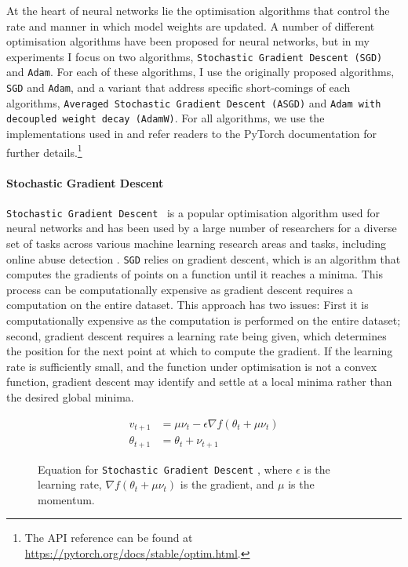 At the heart of neural networks lie the optimisation algorithms that control the rate and manner in which model weights are updated. 
A number of different optimisation algorithms have been proposed for neural networks, but in my experiments I focus on two algorithms, \texttt{Stochastic Gradient Descent (SGD)} and \texttt{Adam}. 
For each of these algorithms, I use the originally proposed algorithms, \texttt{SGD} and \texttt{Adam}, and a variant that address specific short-comings of each algorithms, \texttt{Averaged Stochastic Gradient Descent (ASGD)} and \texttt{Adam with decoupled weight decay (AdamW)}. 
For all algorithms, we use the implementations used in \citet{Paszke:2019} and refer readers to the PyTorch documentation for further details.\footnote{The API reference can be found at \url{https://pytorch.org/docs/stable/optim.html}.}

\paragraph{Stochastic Gradient Descent}
\texttt{Stochastic Gradient Descent}~\citep{Sutskever:2013} is a popular optimisation algorithm used for neural networks and has been used by a large number of researchers for a diverse set of tasks across various machine learning research areas and tasks, including online abuse detection \citep{Singh:2018,Bodapati:2019}. 
\texttt{SGD} relies on gradient descent, which is an algorithm that computes the gradients of points on a function until it reaches a minima. 
This process can be computationally expensive as gradient descent requires a computation on the entire dataset. 
This approach has two issues: First it is computationally expensive as the computation is performed on the entire dataset; second, gradient descent requires a learning rate being given, which determines the position for the next point at which to compute the gradient. 
If the learning rate is sufficiently small, and the function under optimisation is not a convex function, gradient descent may identify and settle at a local minima rather than the desired global minima.

\begin{figure}[h]
  \begin{align}\label{eq:sgd}
    v_{t+1} &= \mu \nu_t - \epsilon \nabla f(\theta_t + \mu \nu_t)\\
    \theta_{t+1} &= \theta_t + \nu_{t+1}
  \end{align}
  \caption[Equation for \texttt{Stochastic Gradient Descent}]{Equation for \texttt{Stochastic Gradient Descent} \citep{Sutskever:2014}, where $\epsilon$ is the learning rate, $\nabla f(\theta_t + \mu\nu_t)$ is the gradient, and $\mu$ is the momentum.}
\end{figure}

